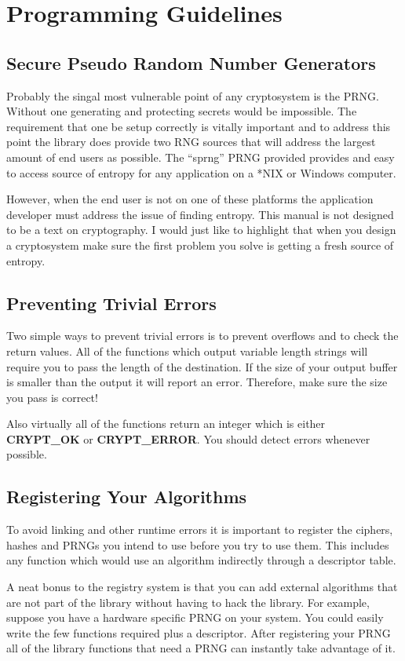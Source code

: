 \documentclass{book}
\begin{document}
\chapter{Programming Guidelines}

\section{Secure Pseudo Random Number Generators}
Probably the singal most vulnerable point of any cryptosystem is the PRNG.  Without one generating and protecting secrets
would be impossible.  The requirement that one be setup correctly is vitally important and to address this point the library
does provide two RNG sources that will address the largest amount of end users as possible.  The ``sprng'' PRNG provided 
provides and easy to access source of entropy for any application on a *NIX or Windows computer.  

However, when the end user is not on one of these platforms the application developer must address the issue of finding
entropy.  This manual is not designed to be a text on cryptography.  I would just like to highlight that when you design
a cryptosystem make sure the first problem you solve is getting a fresh source of entropy.  

\section{Preventing Trivial Errors}
Two simple ways to prevent trivial errors is to prevent overflows and to check the return values.  All of the functions
which output variable length strings will require you to pass the length of the destination.  If the size of your output
buffer is smaller than the output it will report an error.  Therefore, make sure the size you pass is correct!

Also virtually all of the functions return an integer which is either {\bf CRYPT\_OK} or {\bf CRYPT\_ERROR}.  You should
detect errors whenever possible.

\section{Registering Your Algorithms}
To avoid linking and other runtime errors it is important to register the ciphers, hashes and PRNGs you intend to use before you try to use them.  This includes any function which would use an algorithm indirectly through a descriptor table.  

A neat bonus to the registry system is that you can add external algorithms that are not part of the library without having to hack the library.  For example, suppose you have a hardware specific PRNG on your system.  You could easily write the few functions required plus a descriptor.  After registering your PRNG all of the library functions that need a PRNG can instantly take advantage of it.
\end{document}
